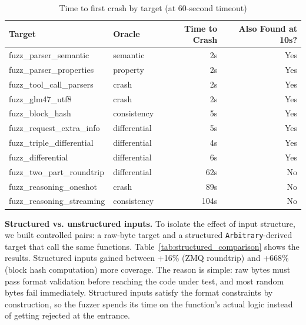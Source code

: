 \documentclass[11pt]{article}
\begin{document}
\begin{table}[H]
\centering
\caption{Time to first crash by target (at 60-second timeout)}
\label{tab:time_to_crash}
\footnotesize
\begin{tabular}{@{}llrr@{}}
\toprule
Target & Oracle & Time to Crash & Also Found at 10s? \\
\midrule
fuzz\_parser\_semantic       & semantic     & 2s  & Yes \\
fuzz\_parser\_properties     & property     & 2s  & Yes \\
fuzz\_tool\_call\_parsers    & crash        & 2s  & Yes \\
fuzz\_glm47\_utf8            & crash        & 2s  & Yes \\
fuzz\_block\_hash            & consistency  & 5s  & Yes \\
fuzz\_request\_extra\_info   & differential & 5s  & Yes \\
fuzz\_triple\_differential   & differential & 4s  & Yes \\
fuzz\_differential           & differential & 6s  & Yes \\
\addlinespace
fuzz\_two\_part\_roundtrip   & differential & 62s  & No \\
fuzz\_reasoning\_oneshot     & crash        & 89s  & No \\
fuzz\_reasoning\_streaming   & consistency  & 104s & No \\
\bottomrule
\end{tabular}
\end{table}

\textbf{Structured vs. unstructured inputs.} To isolate the effect of input structure, we built controlled pairs: a raw-byte target and a structured \texttt{Arbitrary}-derived target that call the same functions. Table~\ref{tab:structured_comparison} shows the results. Structured inputs gained between +16\% (ZMQ roundtrip) and +668\% (block hash computation) more coverage. The reason is simple: raw bytes must pass format validation before reaching the code under test, and most random bytes fail immediately. Structured inputs satisfy the format constraints by construction, so the fuzzer spends its time on the function's actual logic instead of getting rejected at the entrance.
\end{document}
